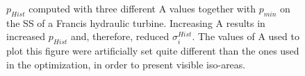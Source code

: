 
\begin{figure}[h!]
\begin{minipage}[b]{1\linewidth}
 \centering
\end{minipage}
\caption{$p_{Hist}$ computed with three different A values together with $p_{min}$ on the SS of a Francis hydraulic turbine. Increasing A results in increased $p_{Hist}$ and, therefore, reduced $\sigma_i^{Hist}$. The values of A used to plot this figure were artificially set quite different than the ones used in the optimization, in order to present visible iso-areas.}
\label{design-cav-histo}
\end{figure}



